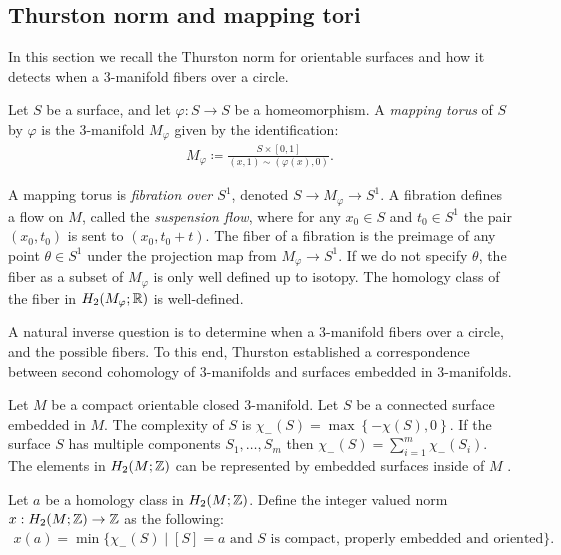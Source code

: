 \subsection{Thurston norm and mapping tori}
\label{sec:backgr-thurst-norm}
In this section we recall the Thurston norm for orientable surfaces and how it detects when a 3-manifold fibers over a circle.

 Let $S$ be a surface, and let $\varphi: S \to S$ be a homeomorphism.  A {\it mapping torus} of $S$ by $\varphi$ is the $3$-manifold $M_\varphi$ given by the identification:
\begin{align*}
  M_\varphi \coloneqq \frac{S \times [0,1]}{(x,1) \sim (\varphi(x), 0)}.
\end{align*}

A mapping torus is \emph{fibration over $S^1$}, denoted $S\rightarrow M_\varphi\rightarrow S^1$.
A fibration defines a flow on $M$, called the \emph{suspension flow}, where for any $x_0\in S$ and $t_0\in S^1$ the pair $(x_0,t_0)$ is sent to $(x_0,t_0+t)$.
The fiber of a fibration is the preimage of any point $\theta \in S^1$ under the projection map from $M_{\varphi} \to S^1$.
If we do not specify $\theta$, the fiber as a subset of $M_\varphi$ is only well defined up to isotopy.   The homology class of the fiber in $H_2(M_{\varphi}; \mathbb{R})$ is well-defined.

A natural inverse question is to determine when a 3-manifold fibers over a circle, and the possible fibers.  To this end, Thurston established a correspondence between second cohomology of 3-manifolds and surfaces embedded in 3-manifolds.

 Let $M$ be a compact orientable closed $3$-manifold.
Let $S$ be a connected surface embedded in $M$.  The complexity of $S$ is $\chi_-(S) = \max\left\{-\chi(S),0\right\}$.
If the surface $S$ has multiple components $S_1, \ldots, S_m$ then $\chi_-(S) = \displaystyle\sum_{i=1}^m\chi_-(S_i)$.
The elements in $H_2(M ; \mathbb{Z})$ can be represented by embedded surfaces inside of $M$ \cite[Lemma 1]{thurston1986norm}.


 Let $a$ be a homology class in $H_2(M; \mathbb{Z})$.  Define the integer valued norm $x:H_2(M;\mathbb{Z})\rightarrow \mathbb{Z}$ as the following:
\begin{align*}
  x(a) = \min\{\chi_-(S) \mid [S] = a \text{ and $S$ is compact, properly embedded and oriented}\}.
\end{align*}

